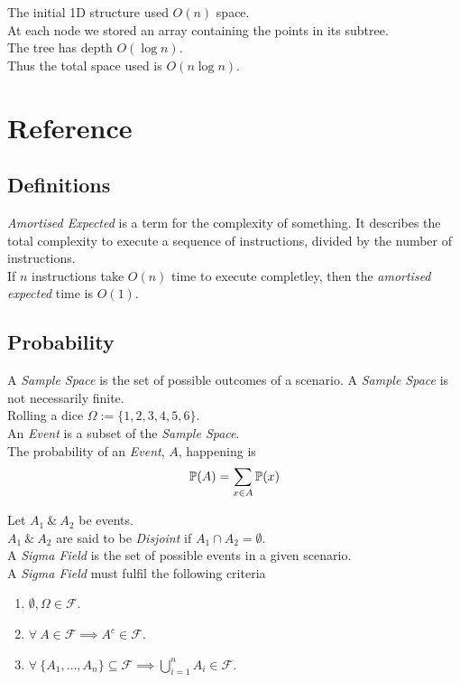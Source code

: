 \documentclass[11pt,a4paper]{article}
\begin{document}
The initial 1D structure used $O(n)$ space.\\
At each node we stored an array containing the points in its subtree.\\
The tree has depth $O(\log n)$.\\
Thus the total space used is $O(n\log n)$.

\newpage
\setcounter{section}{-1}
\section{Reference}

\subsection{Definitions}

\textit{Amortised Expected} is a term for the complexity of something. It describes the total complexity to execute a sequence of instructions, divided by the number of instructions.\\
\eg If $n$ instructions take $O(n)$ time to execute completley, then the \textit{amortised expected} time is $O(1)$.

\subsection{Probability}

A \textit{Sample Space} is the set of possible outcomes of a scenario. A \textit{Sample Space} is not necessarily finite.\\
\eg Rolling a dice $\Omega:=\{1,2,3,4,5,6\}$.\\

An \textit{Event} is a subset of the \textit{Sample Space}.\\
The probability of an \textit{Event}, $A$, happening is
$$\mathbb{P}(A)=\sum_{x\in A}\mathbb{P}(x)$$

Let $A_1\ \&\ A_2$ be events.\\
$A_1\ \&\ A_2$ are said to be \textit{Disjoint} if $A_1\cap A_2=\emptyset$.\\

A \textit{Sigma Field} is the set of possible events in a given scenario.\\
A \textit{Sigma Field} must fulfil the following criteria
\begin{enumerate}
	\item $\emptyset,\Omega\in\mathcal{F}$.
	\item $\forall\ A\in\mathcal{F}\implies A^c\in\mathcal{F}$.
	\item $\forall\ \{A_1,\dots,A_n\}\subseteq\mathcal{F}\implies\bigcup\limits_{i=1}^nA_i\in\mathcal{F}$.
\end{enumerate}
\end{document}
